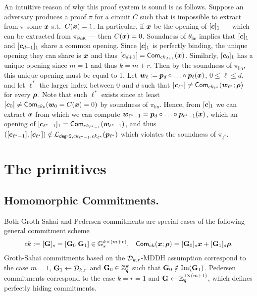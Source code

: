 An intuitive reason of why this proof system is sound is as follows. Suppose an adversary produces a proof $\pi$ for a circuit $C$ such that is impossible to extract from $\pi$ some ${\boldsymbol{x}}$ s.t.~$C({\boldsymbol{x}})=1$. In particular, if ${\boldsymbol{x}}$ be the opening of $[{\boldsymbol{c}}]_1$ --- which can be extracted from $\pi_\mathsf{PoK}$ --- then $C({\boldsymbol{x}})=0$. Soundness of $\theta_\mathsf{lin}$ implies that $[{\boldsymbol{c}}]_1$ and $[{\boldsymbol{c}}_{d+1}]_1$ share a common opening. Since $[{\boldsymbol{c}}]_1$ is perfectly binding, the unique opening they can share is ${\boldsymbol{x}}$ and thus $[{\boldsymbol{c}}_{d+1}]=\mathsf{Com}_{ck_{d+1}}({\boldsymbol{x}})$. Similarly, $[{\boldsymbol{c}}_0]_1$ has a unique opening since $m=1$ and thus $k=m+r$. Then by the soundness of $\pi_\mathsf{lin}$, this unique opening must be equal to 1.
Let ${\boldsymbol{w}}_\ell := {\boldsymbol{p}}_d\circ\ldots\circ {\boldsymbol{p}}_\ell({\boldsymbol{x}})$, $0\leq\ell\leq d$, and let $\ell^*$ the larger index between $0$ and $d$ such that $[{\boldsymbol{c}}_{\ell^*}]\neq\mathsf{Com}_{ck_{\ell^*}}({\boldsymbol{w}}_{\ell^*};{\boldsymbol{\rho}})$ for every ${\boldsymbol{\rho}}$. Note that such $\ell^*$ exists since at least $[{\boldsymbol{c}}_0]\neq\mathsf{Com}_{ck_0}({\boldsymbol{w}}_0 = C({\boldsymbol{x}})=0)$ by soundness of $\pi_\mathsf{lin}$. Hence, from $[{\boldsymbol{c}}]_1$ we can extract ${\boldsymbol{x}}$ from which we can compute ${\boldsymbol{w}}_{\ell^*-1} = {\boldsymbol{p}}_d\circ\ldots\circ {\boldsymbol{p}}_{\ell^*-1}({\boldsymbol{x}})$, which an opening of $[{\boldsymbol{c}}_{\ell^*-1}]_1=\mathsf{Com}_{ck_{\ell^*-1}}({\boldsymbol{w}}_{\ell^*-1})$, and thus $([{\boldsymbol{c}}_{\ell^*-1}],[{\boldsymbol{c}}_{\ell^*}])\notin\mathcal{L}_{\mathsf{deg}\mbox{-}2,ck_{\ell^*-1},ck_{\ell^*}}({\boldsymbol{p}}_{\ell^*})$ which violates the soundness of $\pi_{\ell^*}$.

\section{The primitives}

\subsection{Homomorphic Commitments.}
Both Groth-Sahai and Pedersen commitments are special cases of the following general commitment scheme
\begin{align*}
&ck:=[\mathbf{{G}}]_s=[\mathbf{{G}}_0|\mathbf{{G}}_1]\in\mathbb{G}_s^{k\times (m+r)},
& \mathsf{Com}_{ck}({\boldsymbol{x}};{\boldsymbol{\rho}})=[\mathbf{{G}}_0]_s{\boldsymbol{x}}+[\mathbf{{G}}_1]_s{\boldsymbol{\rho}}.
\end{align*}
Groth-Sahai commitments based on the $\mathcal{D}_{k,r}$-MDDH assumption correspond to the case $m=1$, $\mathbf{{G}}_1\gets\mathcal{D}_{k,r}$ and $\mathbf{{G}}_0\in\mathbb{Z}_q^k$ such that $\mathbf{{G}}_0\notin\mathrm{Im}(\mathbf{{G}}_1)$. Pedersen commitments correspond to the case $k=r=1$ and $\mathbf{{G}}\gets\mathbb{Z}_q^{1\times(m+1)}$, which defines perfectly hiding commitments.


